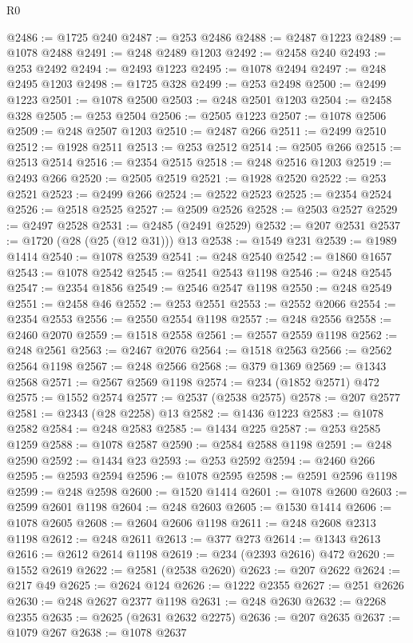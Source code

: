 \begin{lexlean}{R0}
\begin{coremodule}
@2486 := @1725 @240
@2487 := @253 @2486
@2488 := @2487 @1223
@2489 := @1078 @2488
@2491 := @248 @2489 @1203
@2492 := @2458 @240
@2493 := @253 @2492
@2494 := @2493 @1223
@2495 := @1078 @2494
@2497 := @248 @2495 @1203
@2498 := @1725 @328
@2499 := @253 @2498
@2500 := @2499 @1223
@2501 := @1078 @2500
@2503 := @248 @2501 @1203
@2504 := @2458 @328
@2505 := @253 @2504
@2506 := @2505 @1223
@2507 := @1078 @2506
@2509 := @248 @2507 @1203
@2510 := @2487 @266
@2511 := @2499 @2510
@2512 := @1928 @2511
@2513 := @253 @2512
@2514 := @2505 @266
@2515 := @2513 @2514
@2516 := @2354 @2515
@2518 := @248 @2516 @1203
@2519 := @2493 @266
@2520 := @2505 @2519
@2521 := @1928 @2520
@2522 := @253 @2521
@2523 := @2499 @266
@2524 := @2522 @2523
@2525 := @2354 @2524
@2526 := @2518 @2525
@2527 := @2509 @2526
@2528 := @2503 @2527
@2529 := @2497 @2528
@2531 := @2485 (@2491 @2529)
@2532 := @207 @2531
@2537 := @1720 (@28 (@25 (@12 @31))) @13
@2538 := @1549 @231
@2539 := @1989 @1414
@2540 := @1078 @2539
@2541 := @248 @2540
@2542 := @1860 @1657
@2543 := @1078 @2542
@2545 := @2541 @2543 @1198
@2546 := @248 @2545
@2547 := @2354 @1856
@2549 := @2546 @2547 @1198
@2550 := @248 @2549
@2551 := @2458 @46
@2552 := @253 @2551
@2553 := @2552 @2066
@2554 := @2354 @2553
@2556 := @2550 @2554 @1198
@2557 := @248 @2556
@2558 := @2460 @2070
@2559 := @1518 @2558
@2561 := @2557 @2559 @1198
@2562 := @248 @2561
@2563 := @2467 @2076
@2564 := @1518 @2563
@2566 := @2562 @2564 @1198
@2567 := @248 @2566
@2568 := @379 @1369
@2569 := @1343 @2568
@2571 := @2567 @2569 @1198
@2574 := @234 (@1852 @2571) @472
@2575 := @1552 @2574
@2577 := @2537 (@2538 @2575)
@2578 := @207 @2577
@2581 := @2343 (@28 @2258) @13
@2582 := @1436 @1223
@2583 := @1078 @2582
@2584 := @248 @2583
@2585 := @1434 @225
@2587 := @253 @2585 @1259
@2588 := @1078 @2587
@2590 := @2584 @2588 @1198
@2591 := @248 @2590
@2592 := @1434 @23
@2593 := @253 @2592
@2594 := @2460 @266
@2595 := @2593 @2594
@2596 := @1078 @2595
@2598 := @2591 @2596 @1198
@2599 := @248 @2598
@2600 := @1520 @1414
@2601 := @1078 @2600
@2603 := @2599 @2601 @1198
@2604 := @248 @2603
@2605 := @1530 @1414
@2606 := @1078 @2605
@2608 := @2604 @2606 @1198
@2611 := @248 @2608 @2313 @1198
@2612 := @248 @2611
@2613 := @377 @273
@2614 := @1343 @2613
@2616 := @2612 @2614 @1198
@2619 := @234 (@2393 @2616) @472
@2620 := @1552 @2619
@2622 := @2581 (@2538 @2620)
@2623 := @207 @2622
@2624 := @217 @49
@2625 := @2624 @124
@2626 := @1222 @2355
@2627 := @251 @2626
@2630 := @248 @2627 @2377 @1198
@2631 := @248 @2630
@2632 := @2268 @2355
@2635 := @2625 (@2631 @2632 @2275)
@2636 := @207 @2635
@2637 := @1079 @267
@2638 := @1078 @2637

\end{coremodule}
\end{lexlean}
